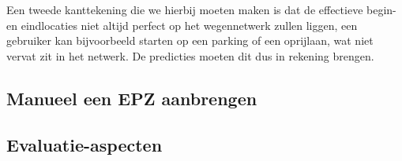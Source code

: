 Een tweede kanttekening die we hierbij moeten maken is dat de effectieve begin-
en eindlocaties niet altijd perfect op het wegennetwerk zullen liggen, een
gebruiker kan bijvoorbeeld starten op een parking of een oprijlaan, wat niet
vervat zit in het netwerk. De predicties moeten dit dus in rekening brengen.

\subsection{Manueel een EPZ aanbrengen}\label{sec:zelf_cloaking}

\subsection{Evaluatie-aspecten}





%  

